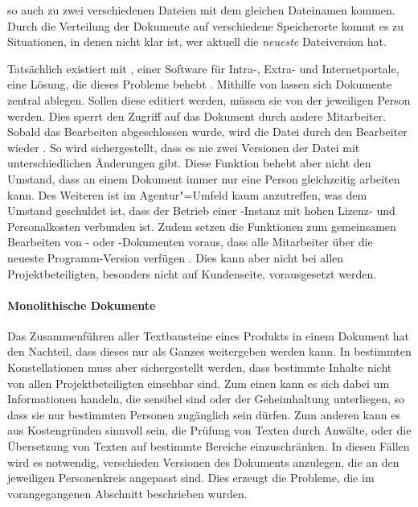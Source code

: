 so auch zu zwei verschiedenen Dateien mit dem gleichen Dateinamen kommen. Durch die Verteilung der Dokumente auf verschiedene Speicherorte kommt es zu Situationen, in denen nicht klar ist, wer aktuell die \emph{neueste} Dateiversion hat.

Tatsächlich existiert mit  , einer Software für Intra-, Extra- und Internetportale, eine Lösung, die dieses Probleme behebt \cite{sharepoint-shared-documents}. Mithilfe von  lassen sich Dokumente zentral ablegen. Sollen diese editiert werden, müssen sie von der jeweiligen Person  werden. Dies sperrt den Zugriff auf das Dokument durch andere Mitarbeiter. Sobald das Bearbeiten abgeschlossen wurde, wird die Datei durch den Bearbeiter wieder . So wird sichergestellt, dass es nie zwei Versionen der Datei mit unterschiedlichen Änderungen gibt. Diese Funktion behebt aber nicht den Umstand, dass an einem Dokument immer nur eine Person gleichzeitig arbeiten kann. Des Weiteren ist  im Agentur"=Umfeld kaum anzutreffen, was dem Umstand geschuldet ist, dass der Betrieb einer -Instanz mit hohen Lizenz- und Personalkosten verbunden ist. Zudem setzen die Funktionen zum gemeinsamen Bearbeiten von - oder -Dokumenten voraus, dass alle Mitarbeiter über die neueste Programm-Version verfügen \cite{sharepoint-wordversions}. Dies kann aber nicht bei allen Projektbeteiligten, besonders nicht auf Kundenseite, vorausgesetzt werden.

\paragraph{Monolithische Dokumente} Das Zusammenführen aller Textbausteine eines Produkts in einem Dokument hat den Nachteil, dass dieses nur als Ganzes weitergeben werden kann. In bestimmten Konstellationen muss aber sichergestellt werden, dass bestimmte Inhalte nicht von allen Projektbeteiligten einsehbar sind. Zum einen kann es sich dabei um Informationen handeln, die sensibel sind oder der Geheimhaltung unterliegen, so dass sie nur bestimmten Personen zugänglich sein dürfen. Zum anderen kann es aus Kostengründen sinnvoll sein, die Prüfung von Texten durch Anwälte, oder die Übersetzung von Texten auf bestimmte Bereiche einzuschränken. In diesen Fällen wird es notwendig, verschieden Versionen des Dokuments anzulegen, die an den jeweiligen Personenkreis angepasst sind. Dies erzeugt die Probleme, die im vorangegangenen Abschnitt beschrieben wurden.

